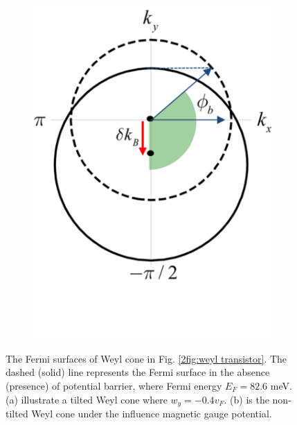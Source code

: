 \begin{figure}[H]
\begin{subfigure}[b]{0.4\linewidth}
            \caption{}
            \label{2fig:anomalous fermi surface1}
        \end{subfigure}
        \begin{subfigure}[b]{0.4\linewidth}
            \includegraphics[width = \linewidth]{fig/Chap 2/anomalous fermi surface2.png}
            \caption{}
            \label{2fig:anomalous fermi surface2}
        \end{subfigure}
    \caption{The Fermi surfaces of Weyl cone in Fig. \ref{2fig:weyl transistor}. 
                The dashed (solid) line represents the Fermi surface in the absence (presence) of potential barrier, where Fermi energy $E_F = 82.6$ meV. 
                (a) illustrate a tilted Weyl cone where $w_y = -0.4 v_F$. 
                (b) is the non-tilted Weyl cone under the influence magnetic gauge potential.}
    \label{2fig:anomalous fermi surface}
    \end{figure}

